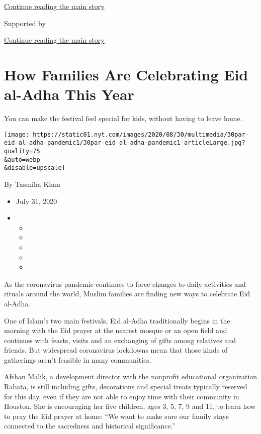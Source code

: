 \protect\hyperlink{after-top}{Continue reading the main story}

Supported by

\protect\hyperlink{after-sponsor}{Continue reading the main story}

\hypertarget{how-families-are-celebrating-eid-al-adha-this-year}{%
\section{How Families Are Celebrating Eid al-Adha This
Year}\label{how-families-are-celebrating-eid-al-adha-this-year}}

You can make the festival feel special for kids, without having to leave
home.

\texttt{[image: https://static01.nyt.com/images/2020/08/30/multimedia/30par-eid-al-adha-pandemic1/30par-eid-al-adha-pandemic1-articleLarge.jpg?quality=75\\\&auto=webp\\\&disable=upscale]}

By Tasmiha Khan

\begin{itemize}
\item
  July 31, 2020
\item
  \begin{itemize}
  \item
  \item
  \item
  \item
  \item
  \end{itemize}
\end{itemize}

As the coronavirus pandemic continues to force changes to daily
activities and rituals around the world, Muslim families are finding new
ways to celebrate Eid al-Adha.

One of Islam's two main festivals, Eid al-Adha traditionally begins in
the morning with the Eid prayer at the nearest mosque or an open field
and continues with feasts, visits and an exchanging of gifts among
relatives and friends. But widespread coronavirus lockdowns mean that
those kinds of gatherings aren't feasible in many communities.

Afshan Malik, a development director with the nonprofit educational
organization Rabata, is still including gifts, decorations and special
treats typically reserved for this day, even if they are not able to
enjoy time with their community in Houston. She is encouraging her five
children, ages 3, 5, 7, 9 and 11, to learn how to pray the Eid prayer at
home: ``We want to make sure our family stays connected to the
sacredness and historical significance.''

